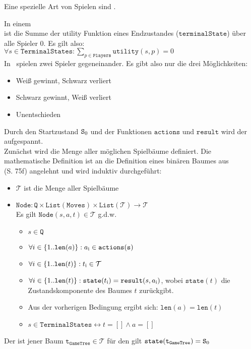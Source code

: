 Eine spezielle Art von Spielen sind .
\begin{Definition}
In einem \\ ist die Summe der utility Funktion eines Endzustandes ($\mathtt{terminalState}$) über alle Spieler 0. Es gilt also:
\vspace{0.2cm}
\\$\forall s \in \mathtt{TerminalStates}: \sum\limits_{p \in \mathtt{Players}} \mathtt{utility}(s, p) = 0$
\vspace{0.2cm}
\\In \ot\ spielen zwei Spieler gegeneinander. Es gibt also nur die drei Möglichkeiten:
\begin{itemize}
\item Weiß gewinnt, Schwarz verliert
\item Schwarz gewinnt, Weiß verliert
\item Unentschieden
\end{itemize}
\end{Definition}
\begin{Definition}
Durch den Startzustand $\mathtt{S\textsubscript{0}}$ und der Funktionen $\mathtt{actions}$ und $\mathtt{result}$ wird der  aufgespannt.
\\Zunächst wird die Menge aller möglichen Spielbäume definiert. Die mathematische Definition ist an die Definition eines binären Baumes aus \cite{StroetmannAlgo19} \\(S. 75f) angelehnt und wird induktiv durchgeführt:
\begin{itemize}
\item $\mathcal{T}$ ist die Menge aller Spielbäume
\item $\mathtt{Node}: \mathtt{Q} \times \mathtt{List}(\mathtt{Moves}) \times \mathtt{List(\mathcal{T})} \rightarrow \mathcal{T} $
\\Es gilt $\mathtt{Node}(s,a,t) \in \mathcal{T}$ g.d.w.
\begin{itemize}
\item $s \in \mathtt{Q}$
\item $\forall i \in \{1 .. \mathtt{len}(a)\}: a\textsubscript{i} \in \mathtt{actions(s)} $
\item $\forall i \in \{1 .. \mathtt{len}(t)\}: t\textsubscript{i} \in \mathcal{T} $
\item $\forall i \in \{1 .. \mathtt{len}(t)\}: \mathtt{state}(t\textsubscript{i}) = \mathtt{result}(s,a\textsubscript{i}) $, wobei $\mathtt{state}(t)$ die Zustandskomponente des Baumes $t$ zurückgibt.
\item Aus der vorherigen Bedingung ergibt sich: $ \mathtt{len}(a) = \mathtt{len}(t) $
\item $s \in \mathtt{TerminalStates} \leftrightarrow t = [] \wedge a = [] $
\end{itemize}
\end{itemize}
Der  ist jener Baum $ \mathtt{t}_{\mathtt{GameTree}} \in \mathcal{T}$ für den gilt $\mathtt{state}(\mathtt{t}_{\mathtt{GameTree}}) = \mathtt{S}\textsubscript{0}$ 
\end{Definition}
